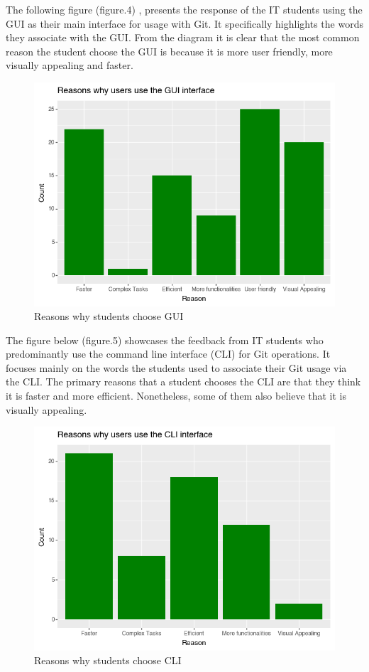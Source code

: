\documentclass[]{report}
\begin{document}
	The following figure (figure.4) , presents the response of the IT students using the GUI as their main interface for usage with Git. It specifically highlights the words they associate with the GUI. From the diagram it is clear that the most common reason the student choose the GUI is because it is more user friendly, more visually appealing and faster.
	
		\begin{figure}[H]
		\centering
		\includegraphics[width=0.75\linewidth]{ReasonsGUI}
		\caption{Reasons why students choose GUI}
		\label{fig: 4}
	\end{figure}
	
	The figure below (figure.5) showcases the feedback from IT students who predominantly use the command line interface (CLI) for Git operations. It focuses mainly on the words the students used to associate their Git usage via the CLI. The primary reasons that a student chooses the CLI are that they think it is faster and more efficient. Nonetheless, some of them also believe that it is visually appealing.
	
	\begin{figure}[H]
		\centering
		\includegraphics[width=0.75\linewidth]{ReasonsCLI}
		\caption{Reasons why students choose CLI}
		\label{fig: 5}
	\end{figure}
	
\end{document}
